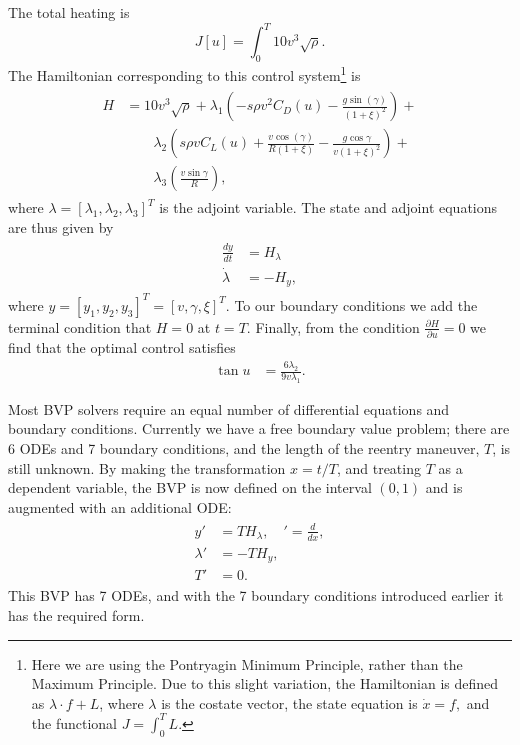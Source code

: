 The total heating is 
\[
J[u] = \int_0^T 10 v^3 \sqrt{\rho}.
\]
The Hamiltonian corresponding to this control system\footnote{Here we are using the Pontryagin Minimum Principle, rather than the Maximum Principle. Due to this slight variation, the Hamiltonian is defined as  $\lambda  \cdot f + L$, where $\lambda$ is the costate vector, the state equation is $\dot{x} = f,$ and the functional $J = \int_0^T L$.} is 
\begin{align}
	\begin{split}
H &=  10v^3 \sqrt{\rho} + \lambda_1 \left ( -s\rho v^2C_D(u) - \frac{g\sin(\gamma)}{(1+\xi)^2} \right) + \\ 
&{ }\quad \quad\lambda_2 \left( s \rho v C_L(u) + \frac{v \cos(\gamma)}{R(1+\xi)} - \frac{g \cos \gamma}{v(1+\xi)^2} \right) + \\
&{ }\quad \quad \lambda_3 \left( \frac{v \sin \gamma}{R} \right),
	\end{split}
\end{align}
where $\lambda = [\lambda_1,\lambda_2,\lambda_3]^T$ is the adjoint variable. 
The state and adjoint equations are thus given by 
\begin{align}
\begin{split}
	\frac{dy}{dt} &= H_{\lambda}\\
	\dot{\lambda} &= -H_{y}, \label{eqn:reentry:full_system}
\end{split}
\end{align}
where $y = [y_1,y_2,y_3]^T = [v,\gamma, \xi]^T$.
To our boundary conditions we add the terminal condition that $H = 0$ at $t = T$. 
Finally, from the condition $\frac{\partial H}{\partial u} = 0$ we find that the optimal control satisfies 
\begin{align}
\tan u &= \frac{6\lambda_2}{9v\lambda_1}.
\end{align}

Most BVP solvers require an equal number of differential equations and boundary conditions. 
Currently we have a free boundary value problem; there are 6 ODEs and 7 boundary conditions, and the length of the reentry maneuver, $T$, is still unknown. 
By making the transformation $x = t/T$, and treating $T$ as a dependent variable, the BVP is now defined on the interval $(0,1)$ and is augmented with an additional ODE: 
\begin{align}
\begin{split}
	y' &= TH_{\lambda},\quad ' = \frac{d}{dx},\\
	\lambda' &= -TH_{y},\\
	T' &= 0. \label{eqn:reentry:full_system}
\end{split}	
\end{align}
This BVP has 7 ODEs, and with the 7 boundary conditions introduced earlier it has the required form.


